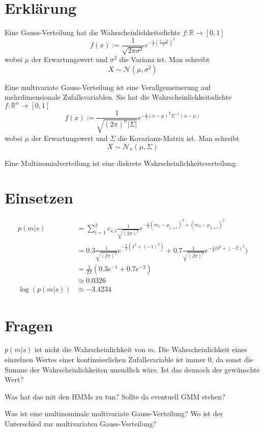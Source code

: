 \documentclass[a4paper]{scrartcl}
\begin{document}
\section{Erklärung}

Eine Gauss-Verteilung hat die Wahrscheinlichkeitsdichte $f:\mathbb{R} \rightarrow [0,1]$
\[f(x) := \frac{1}{\sqrt{2 \pi \sigma^2}} e^{-\frac{1}{2}(\frac{x - \mu}{\sigma})^2}\]
wobei $\mu$ der Erwartungswert und $\sigma^2$ die Varianz ist.
Man schreibt
\[X \sim \mathcal{N}(\mu, \sigma^2)\]

Eine multivariate Gauss-Verteilung ist eine Verallgemeinerung auf mehrdimensionale
Zufallsvariablen. Sie hat die Wahrscheinlichkeitsdichte $f: \mathbb{R}^n \rightarrow [0,1]$
\[f(x) := \frac{1}{\sqrt{(2\pi)^n|\Sigma|}} e^{-\tfrac{1}{2}(x-\mu)^{T}\Sigma^{-1}(x-\mu)}\]
wobei $\mu$ der Erwartungswert und $\Sigma$ die Kovarianz-Matrix ist.
Man schreibt
\[X \sim \mathcal{N}_n(\mu, \Sigma)\]

Eine Multinomialverteilung ist eine diskrete Wahrscheinlichkeitsverteilung.


\section{Einsetzen}

\begin{align}
    p(m|s) &= \sum_{i=1}^{2} c_{s, i} \frac{1}{\sqrt{(2 \pi)^2}} e^{-\frac{1}{2} {(m_1 - \mu_{1,s,i})^2+(m_2 - \mu_{2,s,i})^2}}\\
    &= 0.3 \frac{1}{\sqrt{(2 \pi)^2}} e^{-\frac{1}{2} ({1^2+ (-1)^2})} + 0.7 \frac{1}{\sqrt{(2 \pi)^2}} e^{-\frac{1}{2} ({0^2+ (-2)^2}})\\
    &= \frac{1}{2 \pi} (0.3 e^{-1} + 0.7 e^{-2})\\
    &\approx 0.0326\\
    \log(p(m|s)) &\approx -3.4234
\end{align}

\section{Fragen}

$p(m|s)$ ist nicht die Wahrscheinlichkeit von $m$. Die Wahrscheinlichkeit
eines einzelnen Wertes einer kontinuierlichen Zufallsvariable ist immer $0$,
da sonst die Summe der Wahrscheinlichkeiten unendlich wäre. Ist das
dennoch der gewünschte Wert?

Was hat das mit den HMMs zu tun? Sollte da eventuell GMM stehen?

Was ist eine multinominale multivariate Gauss-Verteilung? Wo ist der
Unterschied zur multivariaten Gauss-Verteilung?
\end{document}
